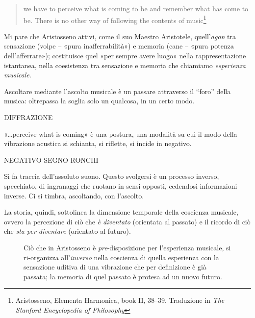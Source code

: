 \begin{quote}
\begin{sf}
\small
we have to perceive what is coming to be and remember what has come to be. There
is no other way of following the contents of music\footnote{Aristosseno, Elementa
Harmonica, book II, 38–39. Traduzione in \emph{The Stanford Encyclopedia of
Philosophy}}
\end{sf}
\end{quote}

Mi pare che Aristosseno attivi, come il suo Maestro Aristotele, quell'\emph{agōn}
\cite{ronchi2001} tra sensazione (volpe – «pura inafferrabilità») e memoria (cane
– «pura potenza dell'afferrare»); costituisce quel «per sempre avere luogo» nella
rappresentazione istantanea, nella coesistenza tra sensazione e memoria che
chiamiamo \emph{esperienza musicale}.

Ascoltare mediante l'ascolto musicale è un passare attraverso il “foro” della
musica: oltrepassa la soglia solo un qualcosa, in un certo modo.

\vspace{1cm}

DIFFRAZIONE

«\ldots perceive what is coming» è una postura, una modalità su cui il modo della
vibrazione acustica si schianta, si riflette, si incide in negativo.

\vspace{1cm}

NEGATIVO SEGNO RONCHI

Si fa traccia dell'assoluto suono. Questo svolgersi è un processo inverso,
specchiato, di ingranaggi che ruotano in sensi opposti, cedendosi informazioni
inverse. Ci si timbra, ascoltando, con l'ascolto.

La storia, quindi, sottolinea la dimensione temporale della coscienza musicale,
ovvero la percezione di ciò che \emph{è diventato} (orientata al passato) e il
ricordo di ciò che \emph{sta per diventare} (orientato al futuro).

\begin{figure}[htbp]
\begin{center}
\caption{Ciò che in Aristosseno è \emph{pre}-disposizione per l'esperienza
musicale, si ri-organizza all'\emph{inverso} \cite{bergson:segno} nella coscienza
di quella esperienza con la sensazione uditiva di una vibrazione che per
definizione è già passata; la memoria di quel passato è protesa ad un nuovo futuro.}
\label{coscienza}
\end{center}
\end{figure}


